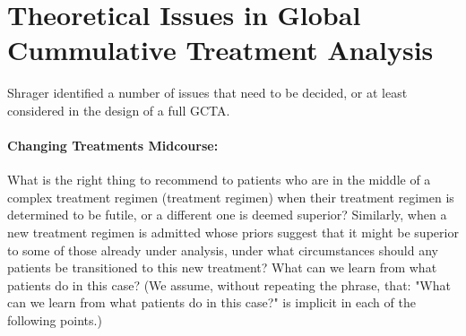 \documentclass[12pt]{article}
\begin{document}
\section*{Theoretical Issues in Global Cummulative Treatment Analysis}

Shrager \cite{shrager_theoretical_2013} identified a number of issues
that need to be decided, or at least considered in the design of a
full GCTA. 

\paragraph*{Changing Treatments Midcourse:}

What is the right thing to recommend to patients who are in the middle
of a complex treatment regimen (treatment regimen) when their
treatment regimen is determined to be futile, or a different one is
deemed superior? Similarly, when a new treatment regimen is admitted
whose priors suggest that it might be superior to some of those
already under analysis, under what circumstances should any patients
be transitioned to this new treatment? What can we learn from what
patients do in this case?  (We assume, without repeating the
phrase, that: "What can we learn from what patients do in this case?"
is implicit in each of the following points.)
\end{document}
